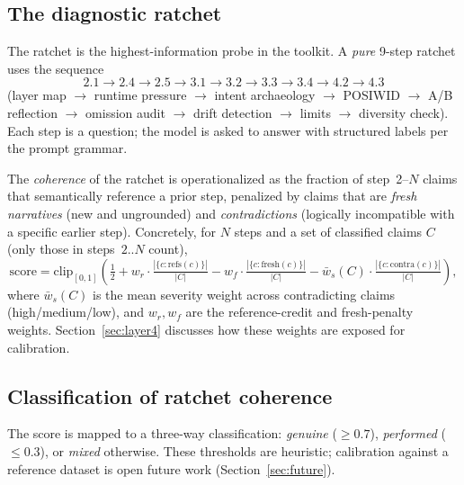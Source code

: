 \subsection{The diagnostic ratchet}
\label{sec:ratchet}

The ratchet is the highest-information probe in the toolkit. A
\emph{pure} 9-step ratchet uses the sequence
$$2.1 \to 2.4 \to 2.5 \to 3.1 \to 3.2 \to 3.3 \to 3.4 \to 4.2 \to 4.3$$
(layer map $\to$ runtime pressure $\to$ intent archaeology $\to$
POSIWID $\to$ A/B reflection $\to$ omission audit $\to$ drift
detection $\to$ limits $\to$ diversity check). Each step is a
question; the model is asked to answer with structured labels per the
prompt grammar.

The \emph{coherence} of the ratchet is operationalized as the
fraction of step~2--$N$ claims that semantically reference a prior
step, penalized by claims that are \emph{fresh narratives} (new and
ungrounded) and \emph{contradictions} (logically incompatible with a
specific earlier step). Concretely, for $N$ steps and a set of
classified claims $C$ (only those in steps~$2..N$ count),
\begin{equation}
    \text{score} = \mathrm{clip}_{[0,1]}\!\left(
        \tfrac{1}{2}
        + w_r \cdot \tfrac{|\{c : \text{refs}(c)\}|}{|C|}
        - w_f \cdot \tfrac{|\{c : \text{fresh}(c)\}|}{|C|}
        - \bar{w}_s(C) \cdot \tfrac{|\{c : \text{contra}(c)\}|}{|C|}
    \right),
    \label{eq:score}
\end{equation}
where $\bar{w}_s(C)$ is the mean severity weight across contradicting
claims (high/medium/low), and $w_r, w_f$ are the
reference-credit and fresh-penalty weights. Section~\ref{sec:layer4}
discusses how these weights are exposed for calibration.

\subsection{Classification of ratchet coherence}

The score is mapped to a three-way classification: \emph{genuine}
($\geq 0.7$), \emph{performed} ($\leq 0.3$), or \emph{mixed}
otherwise. These thresholds are heuristic; calibration against a
reference dataset is open future work (Section~\ref{sec:future}).


